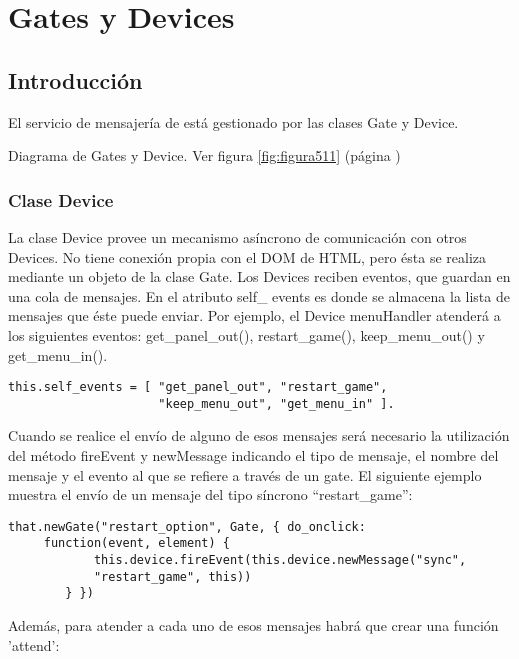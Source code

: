 \section{Gates y Devices}
\label{sec:gates_devices}

\subsection{Introducción}
\label{subsection:intro_gates}

El servicio de mensajería de \lluvia{} está gestionado por las clases Gate y Device.

Diagrama de Gates y Device. Ver figura \ref{fig:figura511} (página \pageref{fig:figura511})

\subsubsection{Clase Device}
\label{subsubsection:device}

La clase Device provee un mecanismo asíncrono de comunicación con otros Devices. No tiene conexión propia con el DOM de HTML, pero ésta se 
realiza mediante un objeto de la clase Gate. Los Devices reciben eventos, que guardan en una cola de mensajes. En el atributo self\_ events es 
donde se almacena la lista de mensajes que éste puede enviar. Por ejemplo, el Device menuHandler atenderá a los siguientes eventos: 
get\_panel\_out(), restart\_game(), keep\_menu\_out() y get\_menu\_in().\\

\begin{verbatim}
this.self_events = [ "get_panel_out", "restart_game", 
                     "keep_menu_out", "get_menu_in" ].
\end{verbatim}

Cuando se realice  el envío de alguno de esos mensajes será necesario la utilización del método fireEvent y newMessage indicando el tipo de
mensaje, el nombre del mensaje y el evento al que se refiere a través de un gate. El siguiente ejemplo muestra el envío de un mensaje del tipo 
síncrono “restart\_game”: 

\begin{verbatim}
that.newGate("restart_option", Gate, { do_onclick: 
     function(event, element) {
            this.device.fireEvent(this.device.newMessage("sync",
            "restart_game", this))
        } })
\end{verbatim}

Además, para atender a cada uno de esos mensajes habrá que crear una función 'attend':\


